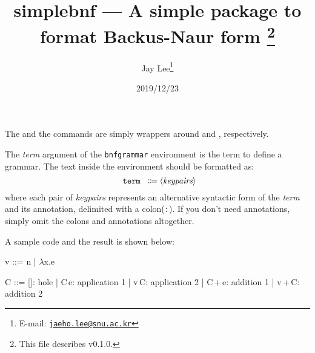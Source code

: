 \documentclass[a4paper]{article}
\title{%
  \textsf{simplebnf} --- A simple package to format Backus-Naur form%
  \footnote{This file describes v0.1.0.}}
\author{Jay Lee\footnote{E-mail: %
  \href{mailto:jaeho.lee@snu.ac.kr}{\texttt{jaeho.lee@snu.ac.kr}}}}
\date{2019/12/23}
\begin{document}
\maketitle

\begin{presentcommand}
   
\end{presentcommand}
The  and the  commands are simply wrappers around
 and , respectively.

\begin{presentcommand}
\end{presentcommand}
The \textit{term} argument of the \texttt{bnfgrammar} environment is the term
to define a grammar.
The text inside the environment should be formatted as:
\begin{equation*}
  \texttt { term } \Coloneqq \langle\textit{keypairs}\rangle
\end{equation*}
where each pair of \textit{keypairs} represents an alternative syntactic form
of the \textit{term} and its annotation, delimited with a colon(\verb/:/).
If you don't need annotations, simply omit the colons and annotations
altogether.

A sample code and the result is shown below:
\begin{exampleside}
\begin{bnfgrammar}
  v ::= n | $\lambda$x.e
\end{bnfgrammar}

\begin{bnfgrammar}
  C ::=
    []:      hole
  | C\,e:    application 1
  | v\,C:    application 2
  | C\,+\,e: addition 1
  | v\,+\,C: addition 2
\end{bnfgrammar}
\end{exampleside}
\end{document}
